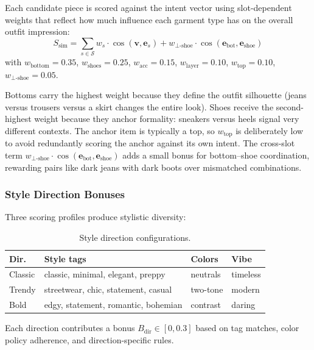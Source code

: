 \documentclass[10pt,twocolumn]{article}
\begin{document}
Each candidate piece is scored against the intent vector using
slot-dependent weights that reflect how much influence each garment type has
on the overall outfit impression:
\begin{equation}
  S_{\text{sim}} = \sum_{s \in \mathcal{S}} w_s \cdot
    \cos(\mathbf{v}, \mathbf{e}_s) + w_{\bot\text{-shoe}} \cdot
    \cos(\mathbf{e}_{\text{bot}}, \mathbf{e}_{\text{shoe}})
\label{eq:sim}
\end{equation}
with $w_{\text{bottom}} = 0.35$, $w_{\text{shoes}} = 0.25$,
$w_{\text{acc}} = 0.15$, $w_{\text{layer}} = 0.10$,
$w_{\text{top}} = 0.10$, $w_{\bot\text{-shoe}} = 0.05$.

Bottoms carry the highest weight because they define the outfit silhouette
(jeans versus trousers versus a skirt changes the entire look).
Shoes receive the second-highest weight because they anchor formality: sneakers
versus heels signal very different contexts.  The anchor item is
typically a top, so $w_{\text{top}}$ is deliberately low to avoid
redundantly scoring the anchor against its own intent.
The cross-slot term $w_{\bot\text{-shoe}} \cdot \cos(\mathbf{e}_{\text{bot}},
\mathbf{e}_{\text{shoe}})$ adds a small bonus for bottom--shoe coordination,
rewarding pairs like dark jeans with dark boots over mismatched combinations.

\subsubsection{Style Direction Bonuses}

Three scoring profiles produce stylistic diversity:

\begin{table}[t]
\centering
\footnotesize
\caption{Style direction configurations.}
\label{tab:directions}
\setlength{\tabcolsep}{3pt}
\begin{tabular}{@{}lp{2.1cm}ll@{}}
\toprule
Dir.\ & Style tags & Colors & Vibe \\
\midrule
Classic & classic, minimal, elegant, preppy & neutrals & timeless \\
Trendy  & streetwear, chic, statement, casual & two-tone & modern \\
Bold    & edgy, statement, romantic, bohemian & contrast & daring \\
\bottomrule
\end{tabular}
\end{table}

Each direction contributes a bonus $B_{\text{dir}} \in [0, 0.3]$ based on
tag matches, color policy adherence, and direction-specific rules.
\end{document}
